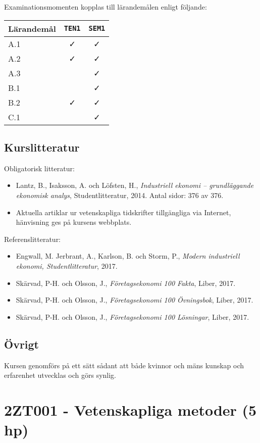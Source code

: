 Examinationsmomenten kopplas till lärandemålen enligt följande:

\begin{longtable}[]{@{}lcc@{}}
\toprule
\textsf{Lärandemål} & \texttt{TEN1} & \texttt{SEM1}\tabularnewline
\midrule
\endhead
A.1 & \faCheck & \faCheck\tabularnewline
A.2 & \faCheck & \faCheck\tabularnewline
A.3 & & \faCheck\tabularnewline
B.1 & & \faCheck\tabularnewline
B.2 & \faCheck & \faCheck\tabularnewline
C.1 & & \faCheck\tabularnewline
\bottomrule
\end{longtable}

\subsection*{Kurslitteratur}

Obligatorisk litteratur:

\begin{itemize}
\tightlist
\item
  Lantz, B., Isaksson, A. och Löfsten, H., \emph{Industriell ekonomi --
  grundläggande ekonomisk analys}, Studentlitteratur, 2014. Antal sidor:
  376 av 376.
\item
  Aktuella artiklar ur vetenskapliga tidskrifter tillgängliga via
  Internet, hänvisning ges på kursens webbplats.
\end{itemize}

Referenslitteratur:

\begin{itemize}
\tightlist
\item
  Engwall, M. Jerbrant, A., Karlson, B. och Storm, P., \emph{Modern
  industriell ekonomi, Studentlitteratur}, 2017.
\item
  Skärvad, P-H. och Olsson, J., \emph{Företagsekonomi 100 Fakta}, Liber,
  2017.
\item
  Skärvad, P-H. och Olsson, J., \emph{Företagsekonomi 100 Övningsbok},
  Liber, 2017.
\item
  Skärvad, P-H. och Olsson, J., \emph{Företagsekonomi 100 Lösningar},
  Liber, 2017.
\end{itemize}

\subsection*{Övrigt}

Kursen genomförs på ett sätt sådant att både kvinnor och mäns kunskap och erfarenhet utvecklas och görs synlig.
\pagebreak
\section*{2ZT001 - Vetenskapliga metoder (5 hp)}

